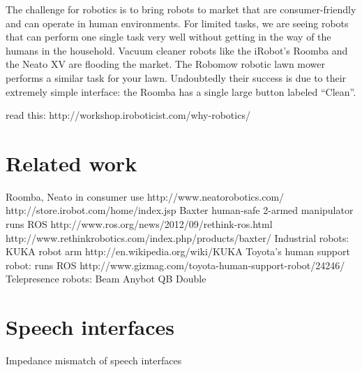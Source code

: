 \documentclass{article}
\begin{document}
The challenge for robotics is to bring robots to market that are consumer-friendly and can operate in human environments. For limited tasks, we are seeing robots that can perform one single task very well without getting in the way of the humans in the household. Vacuum cleaner robots like the iRobot's Roomba and the Neato XV are flooding the market. The Robomow robotic lawn mower performs a similar task for your lawn. Undoubtedly their success is due to their extremely simple interface: the Roomba has a single large button labeled ``Clean''.


read this: http://workshop.iroboticist.com/why-robotics/

\section{Related work}

Roomba, Neato in consumer use
	http://www.neatorobotics.com/
	http://store.irobot.com/home/index.jsp
Baxter human-safe 2-armed manipulator
	runs ROS
	http://www.ros.org/news/2012/09/rethink-ros.html
	http://www.rethinkrobotics.com/index.php/products/baxter/
Industrial robots:
	KUKA robot arm http://en.wikipedia.org/wiki/KUKA
Toyota's human support robot:
	runs ROS
	http://www.gizmag.com/toyota-human-support-robot/24246/
Telepresence robots:
	Beam
	Anybot QB
	Double


\section{Speech interfaces}

Impedance mismatch of speech interfaces



\end{document}
